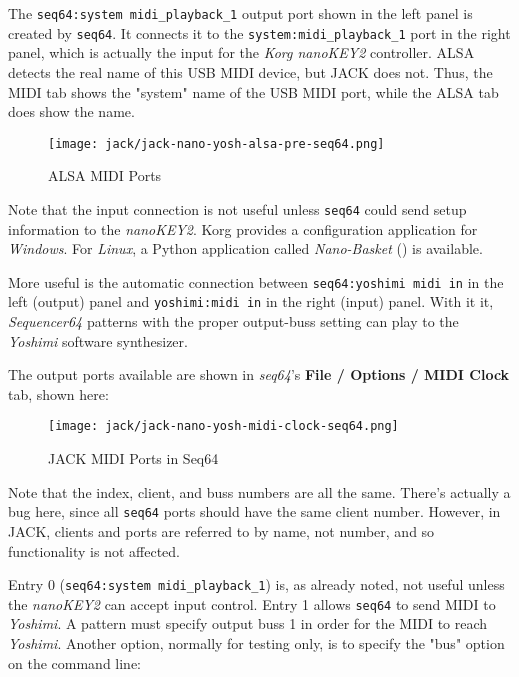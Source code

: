    The \texttt{seq64:system midi\_playback\_1} output port shown
   in the left panel is created by \texttt{seq64}.  It connects it to the 
   \texttt{system:midi\_playback\_1} port in the right panel, which
   is actually the input for the \textsl{Korg nanoKEY2} controller.
   ALSA detects the real name of this USB MIDI device, but JACK does not.  
   Thus, the MIDI tab shows the "system" name of the USB MIDI port, while
   the ALSA tab does show the name.

\begin{figure}[H]
   \centering 
   \texttt{[image: jack/jack-nano-yosh-alsa-pre-seq64.png]}
   \caption{ALSA MIDI Ports}
   \label{fig:seq64_jack_nano_yosh_alsa_pre}
\end{figure}

	Note that the input connection is not useful unless \texttt{seq64} could
   send setup information to the \textsl{nanoKEY2}.
   Korg provides a configuration application for \textsl{Windows}.
   For \textsl{Linux}, a Python application called \textsl{Nano-Basket}
	(\cite{nanobasket}) is available.

   More useful is the automatic connection between
   \texttt{seq64:yoshimi midi in} in the left (output) panel and
   \texttt{yoshimi:midi in} in the right (input) panel.  With it it,
   \textsl{Sequencer64} patterns with the proper output-buss setting can play
   to the \textsl{Yoshimi} software synthesizer.

	The output ports available are shown in \textsl{seq64}'s
	\textbf{File / Options / MIDI Clock} tab, shown here:

\begin{figure}[H]
   \centering 
   \texttt{[image: jack/jack-nano-yosh-midi-clock-seq64.png]}
   \caption{JACK MIDI Ports in Seq64}
   \label{fig:seq64_jack_nano_yosh_midi_clock}
\end{figure}

   Note that the index, client, and buss numbers are all the same.
   There's actually a bug here, since all \texttt{seq64} ports should have the
   same client number.  However, in JACK, clients and ports are referred to by
   name, not number, and so functionality is not affected.

   Entry 0 (\texttt{seq64:system midi\_playback\_1}) is,
   as already noted, not useful unless the \textsl{nanoKEY2} can
   accept input control.  Entry 1 allows \texttt{seq64} to send MIDI
   to \textsl{Yoshimi}.  A pattern must specify output buss 1 in order for the
   MIDI to reach \textsl{Yoshimi}.  Another option, normally for testing only,
   is to specify the "bus" option on the command line:

